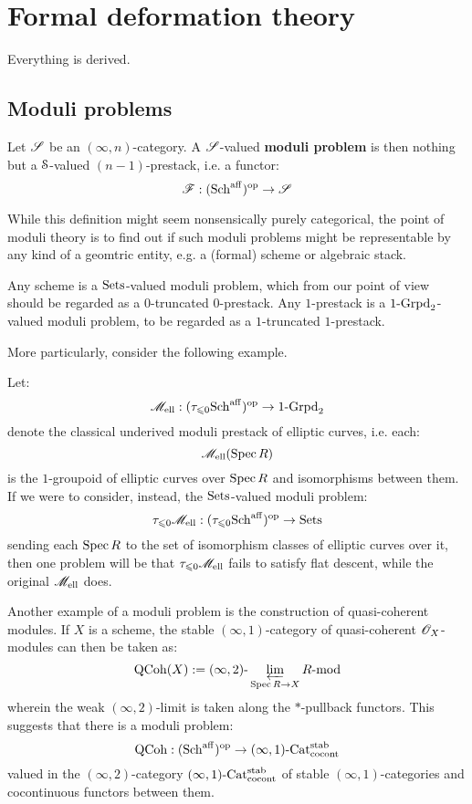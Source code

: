 \section{Formal deformation theory}
    \begin{convention}
        Everything is derived.
    \end{convention}

    \subsection{Moduli problems}
        \begin{definition}
            Let $\scrS$ be an $(\infty, n)$-category. A $\scrS$-valued \textbf{moduli problem} is then nothing but a $\S$-valued $(n - 1)$-prestack, i.e. a functor:
                $$\scrF: (\Sch^{\aff})^{\op} \to \scrS$$
        \end{definition}
        While this definition might seem nonsensically purely categorical, the point of moduli theory is to find out if such moduli problems might be representable by any kind of a geomtric entity, e.g. a (formal) scheme or algebraic stack.
        \begin{example}
            Any scheme is a $\Sets$-valued moduli problem, which from our point of view should be regarded as a $0$-truncated $0$-prestack. Any $1$-prestack is a $1\-\Grpd_2$-valued moduli problem, to be regarded as a $1$-truncated $1$-prestack.  
        \end{example}
        \begin{example}
            More particularly, consider the following example.

            Let:
                $$\scrM_{\elliptic}: (\tau_{\leq 0}\Sch^{\aff})^{\op} \to 1\-\Grpd_2$$
            denote the classical underived moduli prestack of elliptic curves, i.e. each:
                $$\scrM_{\elliptic}(\Spec R)$$
            is the $1$-groupoid of elliptic curves over $\Spec R$ and isomorphisms between them. If we were to consider, instead, the $\Sets$-valued moduli problem:
                $$\tau_{\leq 0}\scrM_{\elliptic}: (\tau_{\leq 0}\Sch^{\aff})^{\op} \to \Sets$$
            sending each $\Spec R$ to the set of isomorphism classes of elliptic curves over it, then one problem will be that $\tau_{\leq 0}\scrM_{\elliptic}$ fails to satisfy flat descent, while the original $\scrM_{\elliptic}$ does. 
        \end{example}
        \begin{example}
            Another example of a moduli problem is the construction of quasi-coherent modules. If $X$ is a scheme, the stable $(\infty, 1)$-category of quasi-coherent $\scrO_X$-modules can then be taken as:
                $$\QCoh(X) := (\infty, 2)\-\projlim_{\Spec R \to X} R\mod$$
            wherein the weak $(\infty, 2)$-limit is taken along the $*$-pullback functors. This suggests that there is a moduli problem:
                $$\QCoh: (\Sch^{\aff})^{\op} \to (\infty, 1)\-\Cat^{\stab}_{\co\cont}$$
            valued in the $(\infty, 2)$-category $(\infty, 1)\-\Cat^{\stab}_{\co\cont}$ of stable $(\infty, 1)$-categories and cocontinuous functors between them. 
        \end{example}

